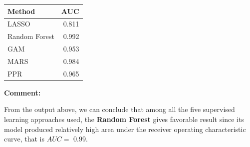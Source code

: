\documentclass[
  11pt,
]{article}
\begin{document}
\begin{longtable}[]{@{}lr@{}}
\toprule\noalign{}
Method & AUC \\
\midrule\noalign{}
\endhead
\bottomrule\noalign{}
\endlastfoot
LASSO & 0.811 \\
Random Forest & 0.992 \\
GAM & 0.953 \\
MARS & 0.984 \\
PPR & 0.965 \\
\end{longtable}

\textbf{Comment:}

From the output above, we can conclude that among all the five
supervised learning approaches used, the \textbf{Random Forest} gives
favorable result since its model produced relatively high area under the
receiver operating characteristic curve, that is \(AUC=\) 0.99.
\end{document}
